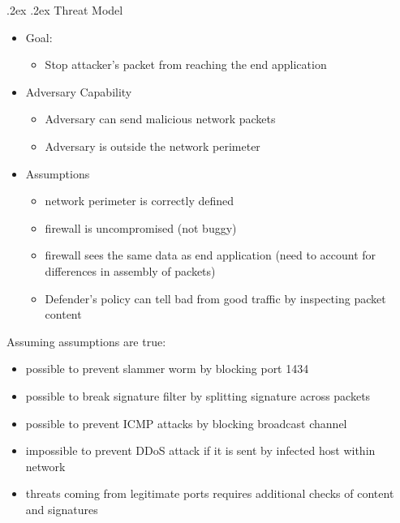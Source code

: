 \documentclass[10pt,landscape,a4paper]{article}
\makeatletter
\renewcommand{\subsubsection}{\@startsection{subsubsection}{1}{0mm}%
	{.2ex}%
	{.2ex}%
	{\rmfamily\bfseries}}
\makeatother
\begin{document}
\begin{multicols*}{4}
\subsubsection{Threat Model}
\begin{itemize}
	\item Goal:
	\begin{itemize}
		\item Stop attacker’s packet from reaching the end application
	\end{itemize}
	\item Adversary Capability
	\begin{itemize}
		\item Adversary can send malicious network packets
		\item Adversary is outside the network perimeter
	\end{itemize}
	\item Assumptions
	\begin{itemize}
		\item network perimeter is correctly defined
		\item firewall is uncompromised (not buggy)
		\item firewall sees the same data as end application (need to account for differences in assembly of packets)
		\item Defender’s policy can tell bad from good traffic by inspecting packet content
	\end{itemize}
\end{itemize}

Assuming assumptions are true:
\begin{itemize}
	\item possible to prevent slammer worm by blocking port 1434
	\item possible to break signature filter by splitting signature across packets
	\item possible to prevent ICMP attacks by blocking broadcast channel
	\item impossible to prevent DDoS attack if it is sent by infected host within network
	\item threats coming from legitimate ports requires additional checks of content and signatures
\end{itemize}

\end{multicols*}
\end{document}
